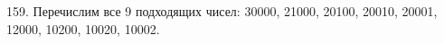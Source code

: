 159. Перечислим все 9 подходящих чисел: 30000, 21000, 20100, 20010, 20001, 12000, 10200, 10020, 10002.\\
